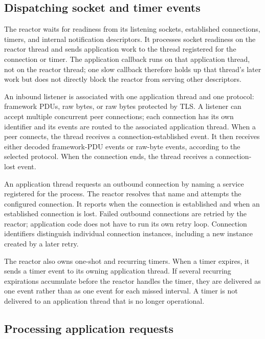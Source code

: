 \subsection{Dispatching socket and timer events}
\label{sec:fw_reactor_dispatch}

The reactor waits for readiness from its listening sockets, established
connections, timers, and internal notification descriptors. It processes
socket readiness on the reactor thread and sends application work to the
thread registered for the connection or timer. The application callback runs
on that application thread, not on the reactor thread; one slow callback
therefore holds up that thread's later work but does not directly block the
reactor from serving other descriptors.

An inbound listener is associated with one application thread and one
protocol: framework PDUs, raw bytes, or raw bytes protected by TLS. A listener
can accept multiple concurrent peer connections; each connection has its own
identifier and its events are routed to the associated application thread.
When a peer connects, the thread receives a connection-established event. It
then receives either decoded framework-PDU events or raw-byte events,
according to the selected protocol. When the connection ends, the thread
receives a connection-lost event.

An application thread requests an outbound connection by naming a service
registered for the process. The reactor resolves that name and attempts the
configured connection. It reports when the connection is established and
when an established connection is lost. Failed outbound connections are
retried by the reactor; application code does not have to run its own retry
loop. Connection identifiers distinguish individual connection instances,
including a new instance created by a later retry.

The reactor also owns one-shot and recurring timers. When a timer expires, it
sends a timer event to its owning application thread. If several recurring
expirations accumulate before the reactor handles the timer, they are
delivered as one event rather than as one event for each missed interval. A
timer is not delivered to an application thread that is no longer operational.

\subsection{Processing application requests}
\label{sec:fw_reactor_commands}

